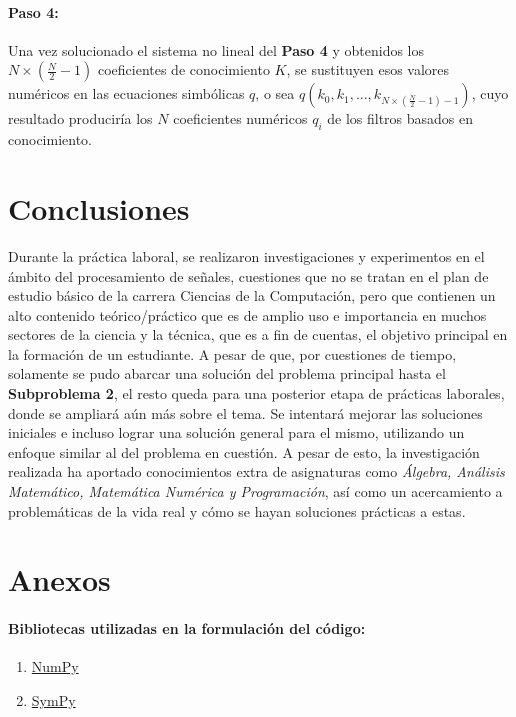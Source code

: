 \documentclass[11pt]{article}
\begin{document}
\paragraph*{Paso 4:}
Una vez solucionado el sistema no lineal del {\bf Paso 4} y obtenidos los \(N \times (\frac{N}{2} - 1)\) coeficientes de conocimiento \(K\), se sustituyen esos valores numéricos en las ecuaciones simbólicas \(q\), o sea 
\(q(k_{0}, k_{1}, ..., k_{N \times (\frac{N}{2} - 1) -1})\), cuyo resultado produciría los \(N\) coeficientes numéricos \(q_{i}\) de los filtros basados en conocimiento.


\clearpage

\section*{Conclusiones}
Durante la práctica laboral, se realizaron investigaciones y experimentos en el ámbito del procesamiento de señales, cuestiones que no se tratan en el plan de estudio básico de la carrera Ciencias de la Computación, 
pero que contienen un alto contenido teórico/práctico que es de amplio uso e importancia en muchos sectores de la ciencia y la técnica, que es a fin de cuentas, el objetivo principal en la formación de un estudiante. A pesar de que, 
por cuestiones de tiempo, solamente se pudo abarcar una solución del problema principal hasta el {\bf Subproblema 2}, el resto queda para una posterior etapa de prácticas laborales, donde se ampliará aún más sobre el tema. Se intentará 
mejorar las soluciones iniciales e incluso lograr una solución general para el mismo, utilizando un enfoque similar al del problema en cuestión. A pesar de esto, la investigación realizada ha aportado conocimientos extra de asignaturas como 
{\it Álgebra, Análisis Matemático, Matemática Numérica y Programación}, así como un acercamiento a problemáticas de la vida real y cómo se hayan soluciones prácticas a estas. 

\clearpage

\section*{Anexos}

\paragraph*{Bibliotecas utilizadas en la formulación del código:}
\begin{enumerate}
    \item \href{https://numpy.org/}{NumPy} 
    \item \href{https://www.sympy.org/}{SymPy} 
\end{enumerate}
\end{document}
